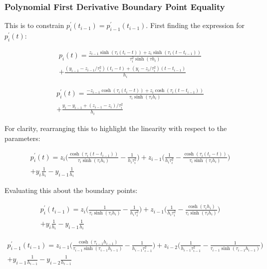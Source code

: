 \documentclass{article}
\begin{document}
\subsubsection{Polynomial First Derivative Boundary Point Equality}
This is to constrain $p^\prime_i(t_{i-1}) = p^\prime_{i-1}(t_{i-1})$. First finding the 
expression for $p^\prime_i(t)$:

\begin{multline}
    p_i(t) = \frac{z_{i-1} \sinh(\tau_i (t_i - t)) + z_i \sinh(\tau_i (t - t_{i-1}))}{\tau_i^2 \sinh(\tau h_i)}  \\
        + \frac{(y_{i-1} - z_{i-1}/\tau_i^2)(t_i - t) + (y_i - z_i/\tau_i^2)(t - t_{i-1})}{h_i}
\end{multline}

\begin{multline}
    p^\prime_i(t) = \frac{ -z_{i-1} \cosh(\tau_i (t_i - t)) + z_i \cosh(\tau_i (t - t_{i-1}))}{\tau_i \sinh(\tau_i h_i)}  \\
        + \frac{y_i - y_{i-1} +  (z_{i-1} - z_i)/\tau_i^2}{h_i}
\end{multline}

For clarity, rearranging this to highlight the linearity with respect to the parameters:

\begin{multline}
    p^\prime_i(t) = z_i \biggl( \frac{ \cosh(\tau_i (t - t_{i-1}))}{\tau_i \sinh(\tau_i h_i)} - \frac{1}{h_i \tau_i^2} \biggr) 
        + z_{i-1} \biggl( \frac{1}{h_i \tau_i^2} - \frac{ \cosh(\tau_i (t_i - t))}{\tau_i \sinh(\tau_i h_i)} \biggr)\\
        + y_i \frac{1}{h_i} - y_{i - 1} \frac{1}{h_i}
\end{multline}

Evaluating this about the boundary points:

\begin{multline}
    p^\prime_i(t_{i-1}) = z_i \biggl( \frac{1}{\tau_i \sinh(\tau_i h_i)} - \frac{1}{h_i \tau_i^2} \biggr) 
        + z_{i-1} \biggl( \frac{1}{h_i \tau_i^2} - \frac{ \cosh(\tau_i h_i)}{\tau_i \sinh(\tau_i h_i)} \biggr)\\
        + y_i \frac{1}{h_i} - y_{i - 1} \frac{1}{h_i}
\end{multline}

\begin{multline}
    p^\prime_{i-1}(t_{i-1}) = z_{i-1} \biggl( \frac{ \cosh(\tau_{i-1} h_{i-1})}{\tau_{i-1} \sinh(\tau_{i-1} h_{i-1})} - \frac{1}{h_{i-1} \tau_{i-1}^2} \biggr) 
        + z_{i-2} \biggl( \frac{1}{h_{i-1} \tau_{i-1}^2} - \frac{1}{\tau_{i-1} \sinh(\tau_{i-1} h_{i-1})} \biggr)\\
        + y_{i-1} \frac{1}{h_{i-1}} - y_{i-2} \frac{1}{h_{i-1}}
\end{multline}
\end{document}
